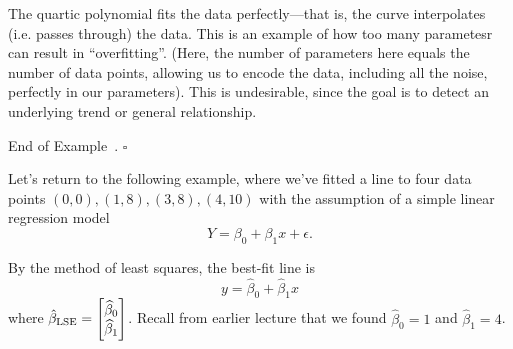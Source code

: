 \documentclass[10pt]{article}
\theoremstyle{definition}
\newtheorem{example}[theorem]{Example}
\renewenvironment{example}
{\begin{oldexample}}
  {\par\smallskip\hfill   End of Example~\theexample. $\square$    \par\end{oldexample}}
\newcommand{\1}[1]{\textbf{1}_{\left[#1\right]}} %
\begin{document}
\begin{example}[Example 11.1 and 11.13 in textbook]
\begin{center}
  \end{center}
  The quartic polynomial fits the data perfectly---that is, the curve
  interpolates (i.e. passes through) the data. This is an example of how too
  many parametesr can result in ``overfitting''. (Here, the number of
  parameters here equals the number of data points, allowing us to encode the
  data, including all the noise, perfectly in our parameters). This is
  undesirable, since the goal is to detect an underlying trend or general
  relationship.
\end{example}

Let's return to the following example, where we've fitted a line to four data
points $(0,0), (1,8), (3,8), (4,10)$ with the assumption of a simple linear
regression model
\begin{equation*}
  Y = \beta_{0}+\beta_{1}x + \epsilon.
\end{equation*}

By the method of least squares, the best-fit line is
\begin{equation*}
  y = \widehat{\beta}_{0}+\widehat{\beta}_{1}x
\end{equation*}
where $\hat{\beta}_{\rm LSE} =
\begin{bmatrix}
  \widehat{\beta}_{0}\\
  \widehat{\beta}_{1}
\end{bmatrix}$. Recall from earlier lecture that we found
$\widehat{\beta}_{0}=1$ and $\widehat{\beta}_{1}=4$.
\end{document}
